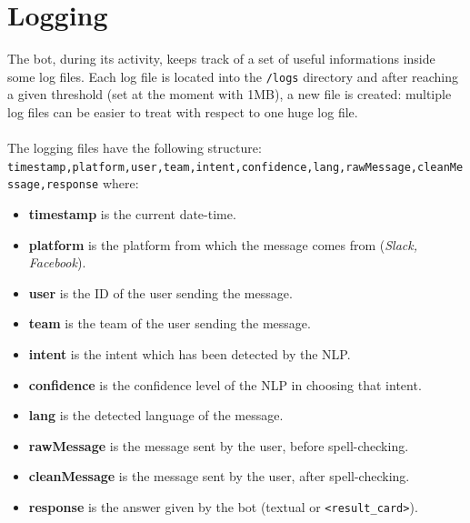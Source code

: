 \documentclass[a4paper,12pt]{report}
\begin{document}
	\section{Logging}
	The bot, during its activity, keeps track of a set of useful informations inside some log files. Each log file is located into the \texttt{/logs} directory and after reaching a given threshold (set at the moment with 1MB), a new file is created: multiple log files can be easier to treat with respect to one huge log file.\\\\
	The logging files have the following structure:
	\texttt{timestamp,platform,user,team,intent,confidence,lang,rawMessage,cleanMessage,response}
	where:
	\begin{itemize}
		\item \textbf{timestamp} is the current date-time.
		\item \textbf{platform} is the platform from which the message comes from (\textit{Slack, Facebook}).
		\item \textbf{user} is the ID of the user sending the message.
		\item \textbf{team} is the team of the user sending the message.
		\item \textbf{intent} is the intent which has been detected by the NLP.
		\item \textbf{confidence} is the confidence level of the NLP in choosing that intent.
		\item \textbf{lang} is the detected language of the message.
		\item \textbf{rawMessage} is the message sent by the user, before spell-checking.
		\item \textbf{cleanMessage} is the message sent by the user, after spell-checking.
		\item \textbf{response} is the answer given by the bot (textual or \texttt{<result\_card>}).
	\end{itemize}
	
\end{document}
